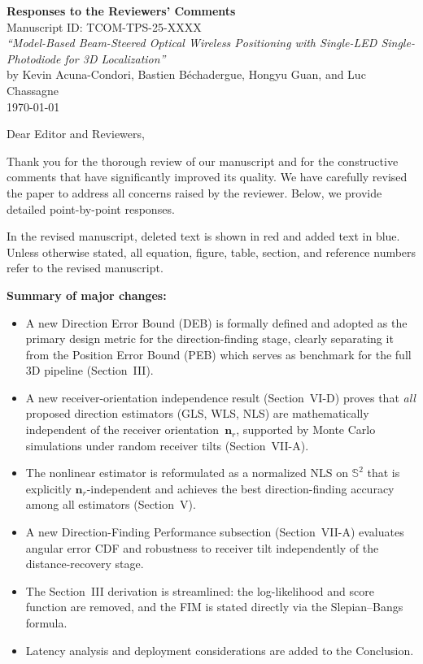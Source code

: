 \documentclass[11pt]{article}
\begin{document}
\begin{center}
{\Large\bfseries Responses to the Reviewers' Comments}\\[12pt]
{\large Manuscript ID: TCOM-TPS-25-XXXX}\\[8pt]
{\large\em ``Model-Based Beam-Steered Optical Wireless Positioning with Single-LED Single-Photodiode for 3D Localization''}\\[8pt]
by Kevin Acuna-Condori, Bastien B\'{e}chadergue, Hongyu Guan, and Luc Chassagne\\[8pt]
\today
\end{center}

\vspace{12pt}

\noindent Dear Editor and Reviewers,

\vspace{6pt}

\noindent Thank you for the thorough review of our manuscript and for the constructive comments that have significantly improved its quality. We have carefully revised the paper to address all concerns raised by the reviewer. Below, we provide detailed point-by-point responses.

In the revised manuscript, deleted text is shown in {\color{red}red} and added text in {\color{blue}blue}. Unless otherwise stated, all equation, figure, table, section, and reference numbers refer to the revised manuscript.

\vspace{6pt}

\noindent\textbf{Summary of major changes:}
\begin{itemize}[leftmargin=*]
    \item A new Direction Error Bound (DEB) is formally defined and adopted as the primary design metric for the direction-finding stage, clearly separating it from the Position Error Bound (PEB) which serves as benchmark for the full 3D pipeline (Section~III).
    \item A new receiver-orientation independence result (Section~VI-D) proves that \emph{all} proposed direction estimators (GLS, WLS, NLS) are mathematically independent of the receiver orientation~$\mathbf{n}_r$, supported by Monte Carlo simulations under random receiver tilts (Section~VII-A).
    \item The nonlinear estimator is reformulated as a normalized NLS on $\mathbb{S}^2$ that is explicitly $\mathbf{n}_r$-independent and achieves the best direction-finding accuracy among all estimators (Section~V).
    \item A new Direction-Finding Performance subsection (Section~VII-A) evaluates angular error CDF and robustness to receiver tilt independently of the distance-recovery stage.
    \item The Section~III derivation is streamlined: the log-likelihood and score function are removed, and the FIM is stated directly via the Slepian--Bangs formula.
    \item Latency analysis and deployment considerations are added to the Conclusion.
\end{itemize}
\end{document}
